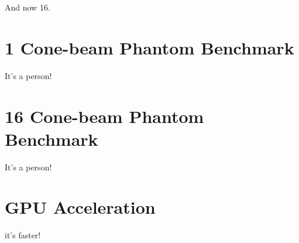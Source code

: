 And now 16.

\section{1 Cone-beam Phantom Benchmark}

It's a person!

\section{16 Cone-beam Phantom Benchmark}

It's a person!

\section{GPU Acceleration}

it's faster!


\endinput
